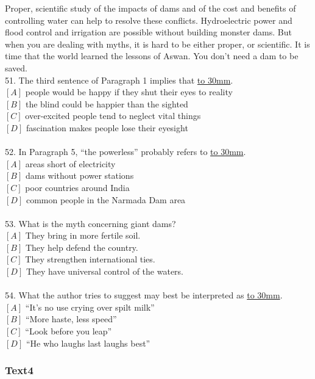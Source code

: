 \documentclass[a4paper]{article}
\begin{document}
\par
Proper, scientific study of the impacts of dams and of the cost and benefits of controlling water can help to resolve these conflicts. Hydroelectric power and flood control and irrigation are possible without building monster dams. But when you are dealing with myths, it is hard to be either proper, or scientific. It is time that the world learned the lessons of Aswan. You don’t need a dam to be saved.
\\51.	The third sentence of Paragraph 1 implies that \underline{\hbox to 30mm{}}.\\$[A]$ people would be happy if they shut their eyes to reality\\$[B]$ the blind could be happier than the sighted\\$[C]$ over-excited people tend to neglect vital things\\$[D]$ fascination makes people lose their eyesight\\\\52.	In Paragraph 5, “the powerless” probably refers to \underline{\hbox to 30mm{}}.\\$[A]$ areas short of electricity\\$[B]$ dams without power stations\\$[C]$ poor countries around India\\$[D]$ common people in the Narmada Dam area\\\\53.	What is the myth concerning giant dams?\\$[A]$ They bring in more fertile soil.\\$[B]$ They help defend the country.\\$[C]$ They strengthen international ties.\\$[D]$ They have universal control of the waters.\\\\54.	What the author tries to suggest may best be interpreted as \underline{\hbox to 30mm{}}.\\$[A]$ “It’s no use crying over spilt milk”\\$[B]$ “More haste, less speed”\\$[C]$ “Look before you leap”\\$[D]$ “He who laughs last laughs best”\\\subsubsection{Text4}
\end{document}

